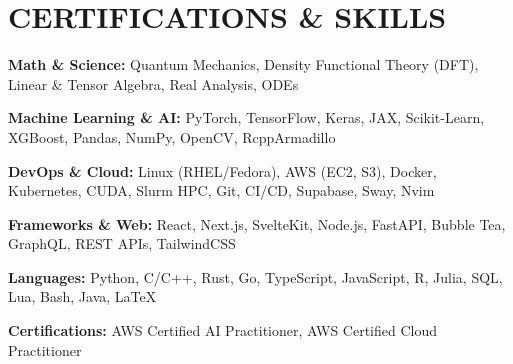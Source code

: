\documentclass[letterpaper,10pt]{article}
\newcommand{\resumeItemListStart}{
  \vspace{-4pt}
  \begin{list}{\textbullet}{
    \setlength{\leftmargin}{0.15in}
    \setlength{\labelwidth}{0.15in}
    \setlength{\labelsep}{0.05in}
    \setlength{\itemsep}{0pt} 
    \setlength{\parsep}{0pt}
    \setlength{\topsep}{0pt}
    \setlength{\partopsep}{0pt}
}}
\newcommand{\resumeItemListEnd}{\end{list}\vspace{-1pt}}
\begin{document}
\section{CERTIFICATIONS \& SKILLS}
    \vspace{2pt}
 \resumeItemListStart
    \item \small{\textbf{Math \& Science:} Quantum Mechanics, Density Functional Theory (DFT), 
    Linear \& Tensor Algebra, Real Analysis, ODEs}
    \item \small{\textbf{Machine Learning \& AI:} PyTorch, TensorFlow, Keras, JAX, Scikit-Learn, 
    XGBoost, Pandas, NumPy, OpenCV, RcppArmadillo}
    \item \small{\textbf{DevOps \& Cloud:} Linux (RHEL/Fedora), AWS (EC2, S3), Docker, Kubernetes, 
    CUDA, Slurm HPC, Git, CI/CD, Supabase, Sway, Nvim}
    \item \small{\textbf{Frameworks \& Web:} React, Next.js, SvelteKit, Node.js, FastAPI, 
    Bubble Tea, GraphQL, REST APIs, TailwindCSS}
    \item \small{\textbf{Languages:} Python, C/C++, Rust, Go, TypeScript, JavaScript, R, Julia, 
    SQL, Lua, Bash, Java, \LaTeX}
    \item \small{\textbf{Certifications:} AWS Certified AI Practitioner, 
    AWS Certified Cloud Practitioner}
 \resumeItemListEnd
\end{document}
